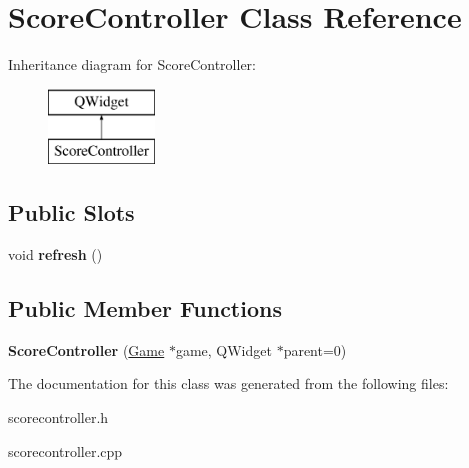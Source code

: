 \hypertarget{classScoreController}{\section{Score\-Controller Class Reference}
\label{classScoreController}
}
Inheritance diagram for Score\-Controller\-:\begin{figure}[H]
\begin{center}
\leavevmode
\includegraphics[height=2.000000cm]{classScoreController}
\end{center}
\end{figure}
\subsection*{Public Slots}
\begin{DoxyCompactItemize}
\item 
\hypertarget{classScoreController_a657c1dac92c56059d52cabe78ec2d7e1}{void {\bfseries refresh} ()}\label{classScoreController_a657c1dac92c56059d52cabe78ec2d7e1}

\end{DoxyCompactItemize}
\subsection*{Public Member Functions}
\begin{DoxyCompactItemize}
\item 
\hypertarget{classScoreController_a50490142b56d6d83df35c814dcff963e}{{\bfseries Score\-Controller} (\hyperlink{classGame}{Game} $\ast$game, Q\-Widget $\ast$parent=0)}\label{classScoreController_a50490142b56d6d83df35c814dcff963e}

\end{DoxyCompactItemize}


The documentation for this class was generated from the following files\-:\begin{DoxyCompactItemize}
\item 
scorecontroller.\-h\item 
scorecontroller.\-cpp\end{DoxyCompactItemize}
